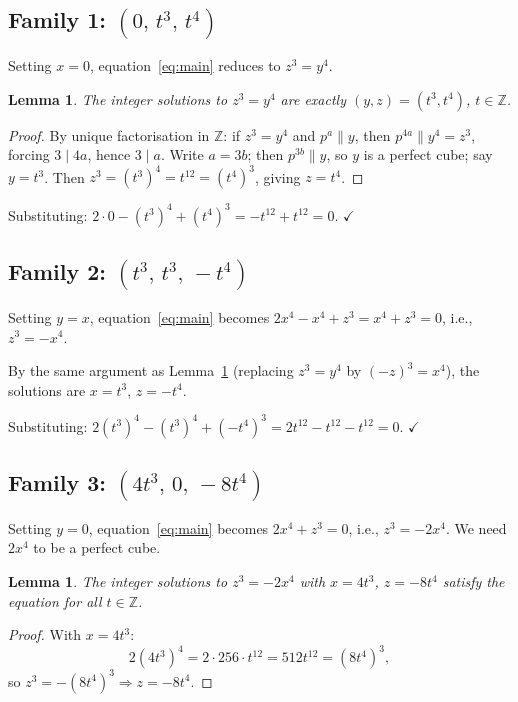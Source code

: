 \documentclass[12pt,a4paper]{article}
\newtheorem{lemma}[theorem]{Lemma}
\theoremstyle{definition}
\newcommand{\Z}{\mathbb{Z}}
\begin{document}
\subsection{Family 1: \texorpdfstring{$(0,\, t^3,\, t^4)$}{(0,t³,t⁴)}}

Setting $x = 0$, equation~\eqref{eq:main} reduces to $z^3 = y^4$.

\begin{lemma}\label{lem:y4z3}
  The integer solutions to $z^3 = y^4$ are exactly $(y, z) = (t^3, t^4)$, $t \in \Z$.
\end{lemma}
\begin{proof}
  By unique factorisation in $\Z$: if $z^3 = y^4$ and $p^a \| y$, then $p^{4a} \| y^4 = z^3$,
  forcing $3 \mid 4a$, hence $3 \mid a$.  Write $a = 3b$; then $p^{3b} \| y$, so $y$ is a
  perfect cube; say $y = t^3$.  Then $z^3 = (t^3)^4 = t^{12} = (t^4)^3$, giving $z = t^4$.
\end{proof}

\noindent Substituting: $2\cdot 0 - (t^3)^4 + (t^4)^3 = -t^{12} + t^{12} = 0$. $\checkmark$

\subsection{Family 2: \texorpdfstring{$(t^3,\, t^3,\, -t^4)$}{(t³,t³,-t⁴)}}

Setting $y = x$, equation~\eqref{eq:main} becomes
$2x^4 - x^4 + z^3 = x^4 + z^3 = 0$, i.e., $z^3 = -x^4$.

By the same argument as Lemma~\ref{lem:y4z3} (replacing $z^3 = y^4$ by $(-z)^3 = x^4$),
the solutions are $x = t^3$, $z = -t^4$.

\noindent Substituting: $2(t^3)^4 - (t^3)^4 + (-t^4)^3 = 2t^{12} - t^{12} - t^{12} = 0$. $\checkmark$

\subsection{Family 3: \texorpdfstring{$(4t^3,\, 0,\, -8t^4)$}{(4t³,0,-8t⁴)}}

Setting $y = 0$, equation~\eqref{eq:main} becomes $2x^4 + z^3 = 0$, i.e., $z^3 = -2x^4$.
We need $2x^4$ to be a perfect cube.

\begin{lemma}\label{lem:2x4cube}
  The integer solutions to $z^3 = -2x^4$ with $x = 4t^3$, $z = -8t^4$ satisfy the equation
  for all $t \in \Z$.
\end{lemma}
\begin{proof}
  With $x = 4t^3$:
  \[
    2(4t^3)^4 = 2 \cdot 256 \cdot t^{12} = 512t^{12} = (8t^4)^3,
  \]
  so $z^3 = -(8t^4)^3 \Rightarrow z = -8t^4$.
\end{proof}
\end{document}
